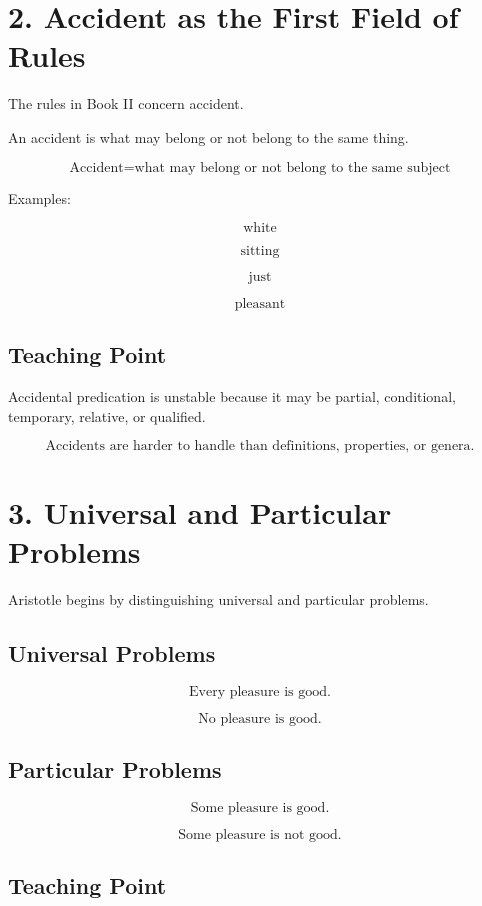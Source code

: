 \documentclass[12pt]{article}
\begin{document}
\section*{2. Accident as the First Field of Rules}

The rules in Book II concern accident.

An accident is what may belong or not belong to the same thing.

\[
\boxed{
\text{Accident} = \text{what may belong or not belong to the same subject}
}
\]

Examples:

\[
\text{white}
\]

\[
\text{sitting}
\]

\[
\text{just}
\]

\[
\text{pleasant}
\]

\subsection*{Teaching Point}

Accidental predication is unstable because it may be partial, conditional,
temporary, relative, or qualified.

\[
\boxed{
\text{Accidents are harder to handle than definitions, properties, or genera.}
}
\]

\section*{3. Universal and Particular Problems}

Aristotle begins by distinguishing universal and particular problems.

\subsection*{Universal Problems}

\[
\text{Every pleasure is good.}
\]

\[
\text{No pleasure is good.}
\]

\subsection*{Particular Problems}

\[
\text{Some pleasure is good.}
\]

\[
\text{Some pleasure is not good.}
\]

\subsection*{Teaching Point}
\end{document}
